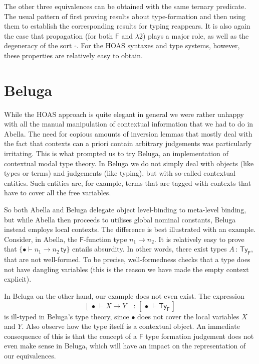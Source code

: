 \documentclass[a4paper,UKenglish]{lipics-v2016}
\newcommand{\ms}{\,}
\newcommand{\mrel}[1]{\mathrel{\ms #1 \ms}}
\newcommand{\OF}{\mrel{:}}
\newcommand{\SysF}{\ensuremath{\mathsf{F}}\xspace}
\newcommand{\SysL}{$\lambda$2\xspace}
\newcommand{\TyF}{\ensuremath{\mathsf{Ty_{F}}}}
\newcommand{\istyFh}[1]{\ensuremath{#1\ms\mathsf{ty}}}
\newcommand{\Typ}{\ensuremath{\square}}
\newcommand{\emptyctx}{\ensuremath{\bullet}}
\begin{document}
The other three equivalences can be obtained with the same ternary predicate.
The usual pattern of first proving results about type-formation and then using them to establish the corresponding results for typing reappears.
It is also again the case that propagation (for both \SysF and \SysL) plays a major role, as well as the degeneracy of the sort $\Typ$.
For the HOAS syntaxes and type systems, however, these properties are relatively easy to obtain.

\section{Beluga}
\label{sec:beluga}

While the HOAS approach is quite elegant in general we were rather unhappy with all the manual manipulation of contextual information that we had to do in Abella.
The need for copious amounts of inversion lemmas that mostly deal with the fact that contexts can a priori contain arbitrary judgements was particularly irritating.
This is what prompted us to try Beluga, an implementation of contextual modal type theory.
In Beluga we do not simply deal with objects (like types or terms) and judgements (like typing), but with so-called contextual entities.
Such entities are, for example, terms that are tagged with contexts that have to cover all the free variables.

So both Abella and Beluga delegate object level-binding to meta-level binding, but while Abella then proceeds to utilises global nominal constants, Beluga instead employs local contexts.
The difference is best illustrated with an example.
Consider, in Abella, the \SysF{}-function type $n_1 \to n_2$.
It is relatively easy to prove that $\{\emptyctx \vdash \istyFh{n_1 \to n_2}\}$ entails absurdity.
In other words, there exist types $A \OF \TyF$, that are not well-formed.
To be precise, well-formedness checks that a type does not have dangling variables (this is the reason we have made the empty context explicit).

\newcommand{\bc}[2]{\ensuremath{[\,#1\,\vdash #2\,]}}
In Beluga on the other hand, our example does not even exist.
The expression \[\bc{\emptyctx}{X \to Y} \OF \bc{\emptyctx}{\TyF}\] is ill-typed in Beluga's type theory, since $\emptyctx$ does not cover the local variables $X$ and $Y$.
Also observe how the type itself is a contextual object.
An immediate consequence of this is that the concept of a \SysF type formation judgement does not even make sense in Beluga, which will have an impact on the representation of our equivalences.
\end{document}
